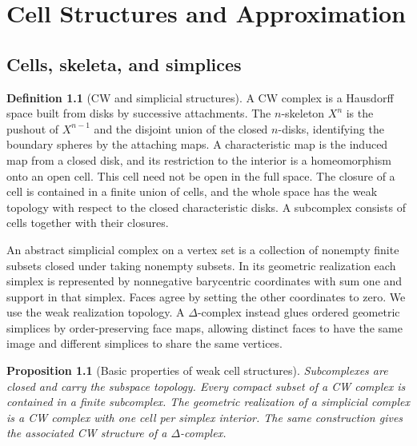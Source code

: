 \documentclass[11pt,oneside,openany]{book}
\theoremstyle{plain}
\newtheorem{proposition}[theorem]{Proposition}
\theoremstyle{definition}
\newtheorem{definition}[theorem]{Definition}
\theoremstyle{remark}
\begin{document}
\chapter{Cell Structures and Approximation}

\section{Cells, skeleta, and simplices}\label{p202:T09}

\begin{definition}[CW and simplicial structures]
A CW complex is a Hausdorff space built from disks by
successive attachments. The \(n\)-skeleton \(X^n\) is the
pushout of \(X^{n-1}\) and the disjoint union of the closed
\(n\)-disks, identifying the boundary spheres by the
attaching maps. A characteristic map is the induced
map from a closed disk, and its restriction to the interior
is a homeomorphism onto an open cell. This cell need not be
open in the full space. The closure of a cell is contained
in a finite union of cells, and the whole space has the weak
topology with respect to the closed characteristic disks.
A subcomplex consists of cells together with their
closures.

An abstract simplicial complex on a vertex set is a
collection of nonempty finite subsets closed under taking
nonempty subsets. In its geometric realization each
simplex is represented by nonnegative barycentric coordinates
with sum one and support in that simplex. Faces agree by
setting the other coordinates to zero. We use the weak
realization topology. A \(\Delta\)-complex instead glues
ordered geometric simplices by order-preserving face maps,
allowing distinct faces to have the same image and different
simplices to share the same vertices.
\end{definition}

\begin{proposition}[Basic properties of weak cell structures]
\label{prop:p202-cw-basics}
Subcomplexes are closed and carry the subspace topology.
Every compact subset of a CW complex is contained in a
finite subcomplex. The geometric realization of a simplicial
complex is a CW complex with one cell per simplex interior.
The same construction gives the associated CW structure
of a \(\Delta\)-complex.
\end{proposition}
\end{document}
